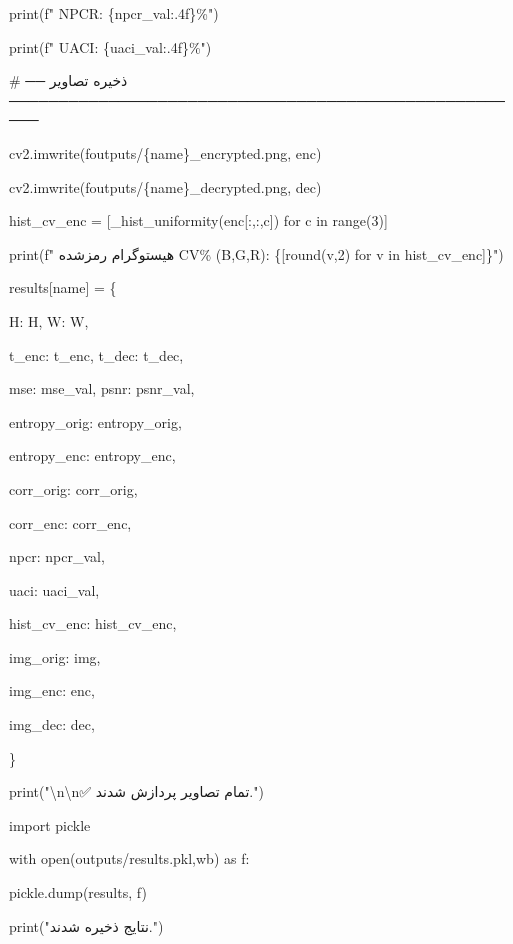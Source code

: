 print(f" NPCR: \{npcr\_val:.4f\}\%")

print(f" UACI: \{uaci\_val:.4f\}\%")

\# ── ذخیره تصاویر ─────────────────────────────────────────────────────

cv2.imwrite(f\textquotesingle outputs/\{name\}\_encrypted.png\textquotesingle, enc)

cv2.imwrite(f\textquotesingle outputs/\{name\}\_decrypted.png\textquotesingle, dec)

hist\_cv\_enc = {[}\_hist\_uniformity(enc{[}:,:,c{]}) for c in range(3){]}

print(f" هیستوگرام رمزشده CV\% (B,G,R): \{{[}round(v,2) for v in hist\_cv\_enc{]}\}")

results{[}name{]} = \{

\textquotesingle H\textquotesingle: H, \textquotesingle W\textquotesingle: W,

\textquotesingle t\_enc\textquotesingle: t\_enc, \textquotesingle t\_dec\textquotesingle: t\_dec,

\textquotesingle mse\textquotesingle: mse\_val, \textquotesingle psnr\textquotesingle: psnr\_val,

\textquotesingle entropy\_orig\textquotesingle: entropy\_orig,

\textquotesingle entropy\_enc\textquotesingle: entropy\_enc,

\textquotesingle corr\_orig\textquotesingle: corr\_orig,

\textquotesingle corr\_enc\textquotesingle: corr\_enc,

\textquotesingle npcr\textquotesingle: npcr\_val,

\textquotesingle uaci\textquotesingle: uaci\_val,

\textquotesingle hist\_cv\_enc\textquotesingle: hist\_cv\_enc,

\textquotesingle img\_orig\textquotesingle: img,

\textquotesingle img\_enc\textquotesingle: enc,

\textquotesingle img\_dec\textquotesingle: dec,

\}

print("\textbackslash n\textbackslash n✅ تمام تصاویر پردازش شدند.")

import pickle

with open(\textquotesingle outputs/results.pkl\textquotesingle,\textquotesingle wb\textquotesingle) as f:

pickle.dump(results, f)

print("نتایج ذخیره شدند.")

